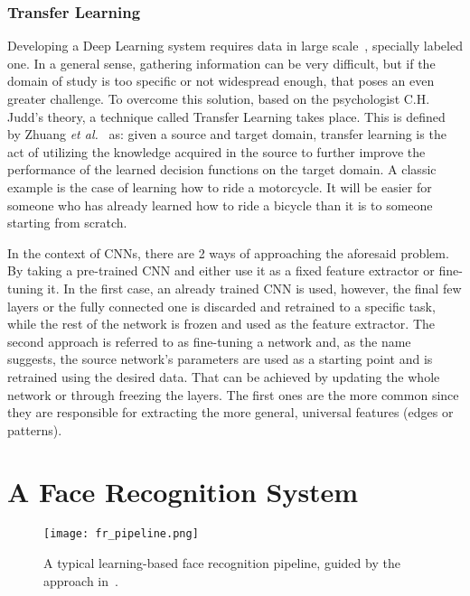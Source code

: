 \documentclass[class=report, crop=false, a4paper, 12pt]{standalone}
\begin{document}
\subsubsection{Transfer Learning} %
\par Developing a Deep Learning system requires data in large scale~\autocite{parkhiDeepFaceRecognition2015}, specially labeled one. In a general sense, gathering information can be very difficult, but if the domain of study is too specific or not widespread enough, that poses an even greater challenge. To overcome this solution, based on the psychologist C.H. Judd's theory, a technique called Transfer Learning takes place. This is defined by Zhuang \textit{et al.}~\autocite{zhuangComprehensiveSurveyTransfer2020} as: given a source and target domain, transfer learning is the act of utilizing the knowledge acquired in the source to further improve the performance of the learned decision functions on the target domain. A classic example is the case of learning how to ride a motorcycle. It will be easier for someone who has already learned how to ride a bicycle than it is to someone starting from scratch.
\par In the context of CNNs, there are 2 ways of approaching the aforesaid problem. By taking a pre-trained CNN and either use it as a fixed feature extractor or fine-tuning it. In the first case, an already trained CNN is used, however, the final few layers or the fully connected one is discarded and retrained to a specific task, while the rest of the network is frozen and used as the feature extractor. The second approach is referred to as fine-tuning a network and, as the name suggests, the source network's parameters are used as a starting point and is retrained using the desired data. That can be achieved by updating the whole network or through freezing the layers. The first ones are the more common since they are responsible for extracting the more general, universal features (edges or patterns).


\newpage
\section{A Face Recognition System}

\begin{figure}[H]
    \texttt{[image: fr\_pipeline.png]}
    \caption[Pipeline]{A typical learning-based face recognition pipeline, guided by the approach in~\autocite{wangDeepFaceRecognition2021}.}
    \label{fig:fr pipeline}
\end{figure}
\end{document}
